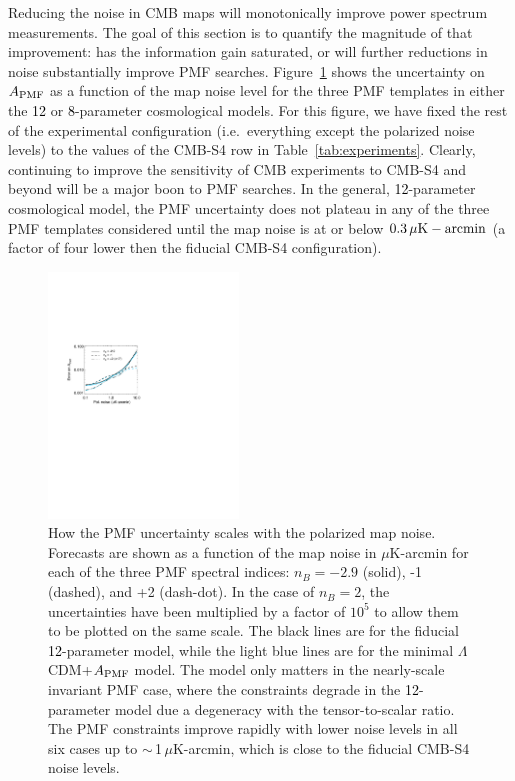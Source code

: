 \documentclass[apj]{emulateapj}
\newcommand{\apmf}{\ensuremath{A_{\rm PMF}}}
\newcommand{\lcdm}{\ensuremath{\Lambda}CDM}
\newcommand{\ukarcmin}{\ensuremath{\mu}{\rm K-arcmin}}
\newcommand{\changed}[1]{\textcolor{Black}{#1}}
\begin{document}
Reducing the noise in CMB maps will monotonically improve power spectrum measurements. 
The goal of this section is to quantify the magnitude of that improvement: has the information gain saturated, or will further reductions in noise substantially improve PMF searches. 
Figure~\ref{fig:sensitivity} shows the uncertainty on \apmf{} as a function of the map noise level for the three PMF templates in either the \changed{12} or \changed{8}-parameter cosmological models. 
For this figure, we have fixed the rest of the experimental configuration (i.e.~everything except the polarized noise levels) to the values of the CMB-S4 row in Table~\ref{tab:experiments}. 
Clearly, continuing to improve the sensitivity of CMB experiments to CMB-S4 and beyond will be a major boon to PMF searches. 
In the general, \changed{12}-parameter cosmological model, the PMF uncertainty does not plateau in any of the three PMF templates considered until the map noise is at or below $0.3\,\ukarcmin$ (a factor of four lower then the fiducial CMB-S4 configuration). 


\begin{figure}[htb]\centering
\includegraphics[width=0.45\textwidth,clip,trim={2.cm 12.5cm 11cm 7.5cm}]{pmf_sens.pdf}
  \caption[]{ \label{fig:sensitivity}
  How the PMF uncertainty  scales with the polarized map noise. 
  Forecasts are shown as a function of the map noise in \ukarcmin{} for each of the three PMF spectral indices: $n_B = -2.9$ (solid), -1 (dashed), and +2 (dash-dot). 
  In the case of $n_B=2$, the uncertainties have been multiplied by a factor of $10^5$ to allow them to be plotted on the same scale. 
  The black lines are for the fiducial \changed{12}-parameter model, while the light blue lines are for the minimal \lcdm{}+\apmf{} model. 
  The model only matters in the nearly-scale invariant PMF case, where the constraints degrade in the \changed{12}-parameter model due a degeneracy with the tensor-to-scalar ratio. 
  The PMF constraints improve rapidly with lower noise levels in all six cases up to $\sim$\,1\,\ukarcmin, which is close to the  fiducial CMB-S4 noise levels. 
    }
\end{figure}
\end{document}
